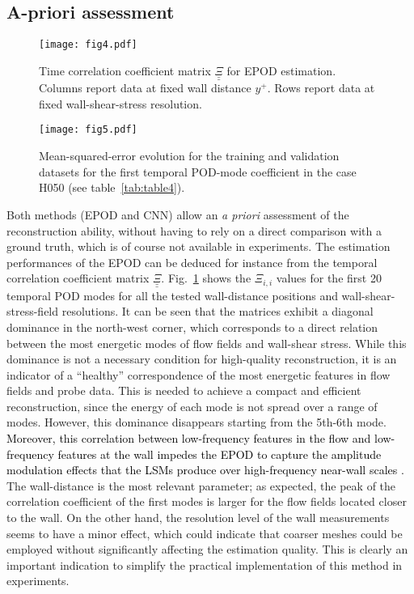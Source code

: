 \subsection{\label{sec:0301}A-priori assessment}

\begin{figure}
\texttt{[image: fig4.pdf]}%
\caption{Time correlation coefficient matrix $\underline{\underline{\Xi}}$ for EPOD estimation. Columns report data at fixed wall distance $y^+$. Rows report data at fixed wall-shear-stress resolution.}
\label{fig:xi_dudy}
\end{figure}

\begin{figure}
\texttt{[image: fig5.pdf]}%
\caption{\label{fig:train}Mean-squared-error evolution for the training  and validation  datasets for the first temporal POD-mode coefficient in the case H050 (see table~\ref{tab:table4}).}
\end{figure}

Both methods (EPOD and CNN) allow an \textit{a priori} assessment of the reconstruction ability, without having to rely on a direct comparison with a ground truth, which is of course not available in experiments.
The estimation performances of the EPOD can be deduced for instance from the temporal correlation coefficient matrix $\underline{\underline{\Xi}}$. Fig.~\ref{fig:xi_dudy} shows the $\Xi_{i,i}$ values for the first 20 temporal POD modes for all the tested wall-distance positions and wall-shear-stress-field resolutions.
It can be seen that the matrices exhibit a diagonal dominance in the north-west corner, which corresponds to a direct relation between the most energetic modes of flow fields and wall-shear stress.
While this dominance is not a necessary condition for high-quality reconstruction, it is an indicator of a ``healthy'' correspondence of the most energetic features in flow fields and probe data.
This is needed to achieve a compact and efficient reconstruction, since the energy of each mode is not spread over a range of modes. However, this dominance disappears starting from the 5th-6th mode.
\textcolor{black}{Moreover, this correlation between low-frequency features in the flow and low-frequency features at the wall impedes the EPOD to capture the amplitude modulation effects that the LSMs produce over high-frequency near-wall scales \citep{mathis2009large}.}
The wall-distance is the most relevant parameter; as expected, the peak of the correlation coefficient of the first modes is larger for the flow fields located closer to the wall. On the other hand, the resolution level of the wall measurements seems to have a minor effect, which could indicate that coarser meshes could be employed without significantly affecting the estimation quality.
This is clearly an important indication to simplify the practical implementation of this method in experiments.

